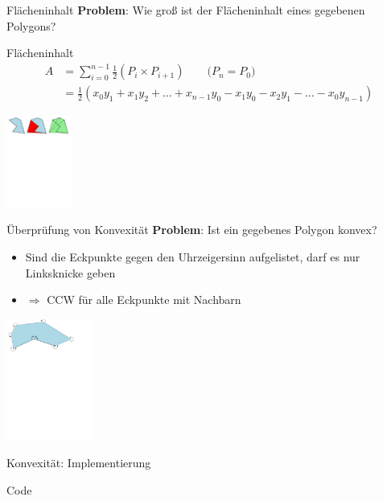 \begin{frame}{Flächeninhalt}
	\textbf{Problem}: Wie groß ist der Flächeninhalt eines gegebenen Polygons?

	\begin{block}{Flächeninhalt}
		\begin{align*}
			A &= \sum_{i=0}^{n-1} \frac{1}{2} (P_i \times P_{i+1})\qquad \textit{($P_n = P_0$)} \\
			  &= \frac{1}{2} ( x_0 y_1 + x_1 y_2 + \ldots + x_{n-1} y_0 - x_1 y_0 - x_2 y_1 - \ldots - x_0 y_{n-1})
		\end{align*}
	\end{block}

	\begin{center}
		\includegraphics[keepaspectratio,height=3cm]{polygon_area.pdf}
	\end{center}
\end{frame}

\begin{frame}{Überprüfung von Konvexität}
	\textbf{Problem}: Ist ein gegebenes Polygon konvex?
	\begin{itemize}
		\item Sind die Eckpunkte gegen den Uhrzeigersinn aufgelistet, darf es nur Linksknicke geben
		\item $\Rightarrow$ CCW für alle Eckpunkte mit Nachbarn
	\end{itemize}

	\begin{center}
		\includegraphics[keepaspectratio,height=4cm]{polygon_concave.pdf}
	\end{center}
\end{frame}

\begin{frame}{Konvexität: Implementierung}
	\begin{exampleblock}{Code}
		\lstset{
			language=C++,
			tabsize=2
		}
		
	\end{exampleblock}
\end{frame}

